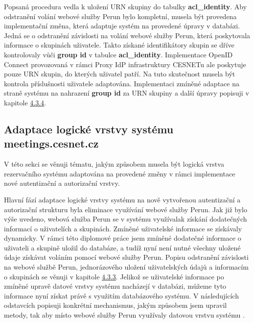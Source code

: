 \documentclass[
  printed, %
  twoside, %
  table,   %
  nolof,     %
  nolot,     %
]{fithesis3}
\begin{document}
Popsaná procedura vedla k uložení URN skupiny do tabulky \textbf{acl\_identity}. Aby odstranění volání webové služby Perun bylo kompletní, musela být provedena implementační změna, která adaptuje systém  na provedené úpravy v databázi. Jedná se o odstranění závislosti na volání webové služby Perun, která poskytovala informace o skupinách uživatele. Takto získané identifikátory skupin se dříve kontrolovaly vůči \textbf{group id} v tabulce \textbf{acl\_identity}. Implementace OpenID Connect provozovaná v rámci Proxy IdP infrastruktury CESNETu ale poskytuje pouze URN skupin, do kterých uživatel patří. Na tuto skutečnost musela být kontrola příslušnosti uživatele adaptována. Implementaci zmíněné adaptace na straně systému  na nahrazení \textbf{group id} za URN skupiny a další úpravy popisuji v kapitole \hyperref[ShongoImpl-web]{4.3.4}. 

\subsection[Adaptace logické vrstvy systému\break meetings.cesnet.cz]{Adaptace logické vrstvy systému meetings.cesnet.cz}
\label{ShongoImpl-web}
V této sekci se věnuji tématu, jakým způsobem musela být logická vrstva rezervačního systému  adaptována na provedené změny v rámci implementace nové autentizační a autorizační vrstvy. 
\par

Hlavní fází adaptace logické vrstvy systému  na nově vytvořenou autentizační a autorizační strukturu byla eliminace využívání webové služby Perun. Jak již bylo výše uvedeno, webová služba Perun se v systému  využívala\break k získání dodatečných informací o uživatelích a skupinách. Zmíněné uživatelské informace se získávaly dynamicky. V rámci této diplomové práce jsem zmíněné dodatečné informace o uživateli a skupině uložil do databáze, a tudíž nyní není nutné všechny uložené údaje získávat voláním pomocí webové služby Perun. Popisu odstranění závislosti na webové službě Perun, jednorázového uložení uživatelských údajů a informacím o skupinách se věnuji v kapitole \hyperref[zpracovaniAUlozeniPerun]{4.3.3}. Jelikož se uživatelské informace po zmíněné upravě datové vrstvy systému  nacházejí v databázi, můžeme tyto informace nyní získat právě s využitím databázového systému. V následujících odstavcích popisuji konkrétní mechanismus, jakým způsobem jsem upravil metody, tak aby místo webové služby Perun využívaly datovou vrstvu systému . 
\end{document}
